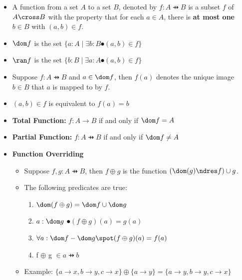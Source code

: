 \documentclass[10pt, landscape]{article}
\begin{document}
\begin{multicols*}{3}
  \begin{itemize}
    \item A function from a set $A$ to a set $B$, denoted by $f: A \pfun B$ is a subset $f$ of $A \cross B$ with the property that for each $a \in A$, there is \textbf{at most one} $b \in B$ with $(a, b) \in f$.
    \item \textbf{$\dom f$} is the set $\{a : A \mid \exists b : B \spot (a, b) \in f\}$
    \item \textbf{$\ran f$} is the set $\{b : B \mid \exists a : A \spot (a, b) \in f\}$
    \item Suppose $f: A \pfun B$ and $a \in \dom f$, then $f(a)$ denotes the unique image $b \in B$ that $a$ is mapped to by $f$.
    \item $(a, b) \in f$ is equivalent to $f(a) = b$
    \item \textbf{Total Function:} $f: A \rightarrow B$ if and only if $\dom f = A$
    \item \textbf{Partial Function:} $f: A \pfun B$ if and only if $\dom f \neq A$
    \item \textbf{Function Overriding}
    \begin{itemize}
      \item Suppose $f, g: A \pfun B$, then $f \oplus g$ is the function $(\dom(g) \ndres f) \cup g$.
      \item The following predicates are true:
      \begin{enumerate}
          \item $\dom(f \oplus g) = \dom f \cup \dom g$
          \item $a : \dom g$ $\spot (f \oplus g)(a) = g(a)$
          \item $\forall a : \dom f - \dom g \spot (f \oplus g)(a) = f(a)$
          \item f $\oplus$ g $\in a \pfun b$
      \end{enumerate}
      \item Example: $\{a \rightarrow x, b \rightarrow y, c \rightarrow x\} \oplus \{a \rightarrow y\} = \{a \rightarrow y, b \rightarrow y, c \rightarrow x\}$
  \end{itemize}
  \end{itemize}

\end{multicols*}
\end{document}
